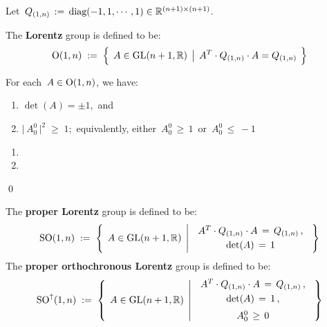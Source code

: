 \vskip 0.5cm
\noindent
Let \,$Q_{(1,n)} \,:=\, \textnormal{diag}(-1,1,\cdots,1) \in \mathbb{R}^{(n+1) \times (n+1)}$.

\vskip 0.5cm
\begin{definition}[$\textnormal{O}(1,n)$]
\mbox{}
\vskip 0.1cm
\noindent
The \textbf{Lorentz} group is defined to be:
\begin{equation*}
\textnormal{O}(1,n)
\; := \;
	\left\{\;\,
		A \overset{{\color{white}.}}{\in} \textnormal{GL}(n+1,\Re)
		\;\left\vert\;\,
			A^{T} \cdot Q_{(1,n)} \cdot A = Q_{(1,n)}
			\right.
		\;\right\}
\end{equation*}
\end{definition}

\vskip 0.5cm
\begin{proposition}
\mbox{}
\vskip 0.1cm
\noindent
For each \,$A \in \textnormal{O}(1,n)$, we have:
\begin{enumerate}
\item
	$\det(A) = \pm 1$,\, and
\item
	$\vert\,A^{0}_{0}\,\vert^{2} \;\geq\; 1$;\, equivalently, either \,$A^{0}_{0} \,\geq\, 1$\, or \,$A^{0}_{0} \,\leq\, -1$
\end{enumerate}
\end{proposition}
\proof
\begin{enumerate}
\item
\item
\end{enumerate}
\qed

\vskip 0.5cm
\begin{definition}
\mbox{}
\vskip 0.1cm
\noindent
The \textbf{proper Lorentz} group is defined to be:
\begin{equation*}
\SO(1,n)
\; := \;
	\left\{\;\,
		A \overset{{\color{white}.}}{\in} \GL(n+1,\Re)
		\;\left\vert\;\,
			\begin{array}{ccc}
			A^{T} \cdot Q_{(1,n)} \cdot A \,=\, Q_{(1,n)}\,,
			\\
			\textnormal{det}(A) \,\overset{{\color{white}1}}{=}\, 1
			\end{array}
			\right.
		\;\right\}
\end{equation*}
The \textbf{proper orthochronous Lorentz} group is defined to be:
\begin{equation*}
\SO^{\uparrow}(1,n)
\; := \;
	\left\{\;\,
		A \overset{{\color{white}.}}{\in} \GL(n+1,\Re)
		\;\left\vert\;\,
			\begin{array}{ccc}
			A^{T} \cdot Q_{(1,n)} \cdot A \,=\, Q_{(1,n)}\,,
			\\
			\textnormal{det}(A) \,\overset{{\color{white}1}}{=}\, 1\,,
			\\
			A^{0}_{0} \,\overset{{\color{white}1}}{\geq}\, 0
			\end{array}
			\right.
		\;\right\}
\end{equation*}
\end{definition}


